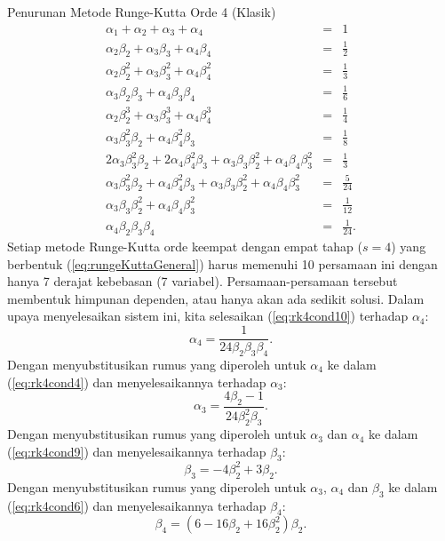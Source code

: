 \begin{digression}{Penurunan Metode Runge-Kutta Orde 4 (Klasik)}
\noindent
\begin{eqnarray}
\alpha_{1}+\alpha_{2}+\alpha_{3}+\alpha_{4} & = & 1\label{eq:rk4cond1}\\
\alpha_{2}\beta_{2}+\alpha_{3}\beta_{3}+\alpha_{4}\beta_{4} & = & \frac{1}{2}\label{eq:rk4cond2}\\
\alpha_{2}\beta_{2}^{2}+\alpha_{3}\beta_{3}^{2}+\alpha_{4}\beta_{4}^{2} & = & \frac{1}{3}\label{eq:rk4cond3}\\
\alpha_{3}\beta_{2}\beta_{3}+\alpha_{4}\beta_{3}\beta_{4} & = & \frac{1}{6}\label{eq:rk4cond4}\\
\alpha_{2}\beta_{2}^{3}+\alpha_{3}\beta_{3}^{3}+\alpha_{4}\beta_{4}^{3} & = & \frac{1}{4}\label{eq:rk4cond5}\\
\alpha_{3}\beta_{3}^{2}\beta_{2}+\alpha_{4}\beta_{4}^{2}\beta_{3} & = & \frac{1}{8}\label{eq:rk4cond6}\\
2\alpha_{3}\beta_{3}^{2}\beta_{2}+2\alpha_{4}\beta_{4}^{2}\beta_{3}+\alpha_{3}\beta_{3}\beta_{2}^{2}+\alpha_{4}\beta_{4}\beta_{3}^{2} & = & \frac{1}{3}\label{eq:rk4cond7}\\
\alpha_{3}\beta_{3}^{2}\beta_{2}+\alpha_{4}\beta_{4}^{2}\beta_{3}+\alpha_{3}\beta_{3}\beta_{2}^{2}+\alpha_{4}\beta_{4}\beta_{3}^{2} & = & \frac{5}{24}\label{eq:rk4cond8}\\
\alpha_{3}\beta_{3}\beta_{2}^{2}+\alpha_{4}\beta_{4}\beta_{3}^{2} & = & \frac{1}{12}\label{eq:rk4cond9}\\
\alpha_{4}\beta_{2}\beta_{3}\beta_{4} & = & \frac{1}{24}.\label{eq:rk4cond10}
\end{eqnarray}
Setiap metode Runge-Kutta orde keempat dengan empat tahap ($s=4$)
yang berbentuk (\ref{eq:rungeKuttaGeneral}) harus memenuhi 10 persamaan
ini dengan hanya 7 derajat kebebasan (7 variabel). Persamaan-persamaan
tersebut membentuk himpunan dependen, atau hanya akan ada sedikit
solusi. Dalam upaya menyelesaikan sistem ini, kita selesaikan (\ref{eq:rk4cond10})
terhadap $\alpha_{4}$:
\[
\alpha_{4}=\frac{1}{24\beta_{2}\beta_{3}\beta_{4}}.
\]
Dengan menyubstitusikan rumus yang diperoleh untuk $\alpha_{4}$ ke
dalam (\ref{eq:rk4cond4}) dan menyelesaikannya terhadap $\alpha_{3}$:
\[
\alpha_{3}=\frac{4\beta_{2}-1}{24\beta_{2}^{2}\beta_{3}}.
\]
Dengan menyubstitusikan rumus yang diperoleh untuk $\alpha_{3}$ dan
$\alpha_{4}$ ke dalam (\ref{eq:rk4cond9}) dan menyelesaikannya terhadap
$\beta_{3}$:
\[
\beta_{3}=-4\beta_{2}^{2}+3\beta_{2}.
\]
Dengan menyubstitusikan rumus yang diperoleh untuk $\alpha_{3}$,
$\alpha_{4}$ dan $\beta_{3}$ ke dalam (\ref{eq:rk4cond6}) dan menyelesaikannya
terhadap $\beta_{4}$:
\[
\beta_{4}=(6-16\beta_{2}+16\beta_{2}^{2})\beta_{2}.
\]


\end{digression}
